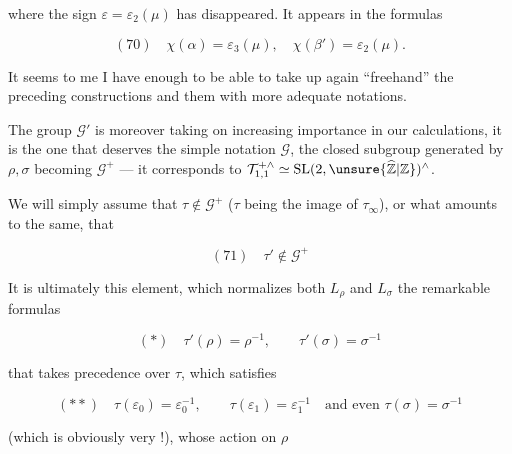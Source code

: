 where the sign $\varepsilon=\varepsilon_2(\mu)$ has disappeared. It appears in the formulas

\[
(70)\quad\chi(\alpha)=\varepsilon_3(\mu),\quad
\chi(\beta')=\varepsilon_2(\mu).
\]

It seems to me I have enough to be able to take up again ``freehand'' the
preceding constructions and  them with more adequate notations.

The group $\mathcal G'$
is moreover taking on increasing importance in our calculations, it is the one that deserves
 the simple notation $\mathcal G$, the closed subgroup
generated by $\rho,\sigma$ becoming $\mathcal G^{+}$ --- it corresponds to
$\mathcal T_{1,1}^{+\wedge}\simeq\mathrm{SL}(2,\unsure{\widehat{\mathbb Z}|\mathbb Z})^{\wedge}$.

We will simply assume that $\tau\notin\mathcal G^{+}$
($\tau$ being the image of $\tau_\infty$), or what amounts to the
same, that

\[
(71)\quad\tau'\notin\mathcal G^{+}
\]




It is ultimately this element, which normalizes both $L_\rho$ and $L_\sigma$
  the remarkable formulas

\[
(*)\quad \tau'(\rho)=\rho^{-1},\qquad \tau'(\sigma)=\sigma^{-1}
\]

that takes precedence over $\tau$, which satisfies

\[
(**)\quad \tau(\varepsilon_0)=\varepsilon_0^{-1},\qquad
\tau(\varepsilon_1)=\varepsilon_1^{-1}
\quad\text{and even }\tau(\sigma)=\sigma^{-1}
\]

(which is obviously very  !),  whose action on $\rho$

